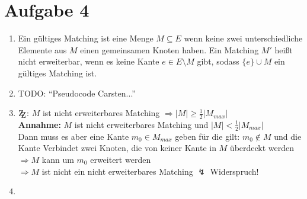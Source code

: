 \documentclass[10pt,a4paper]{article}
\newcommand{\zz}{\mathrm{Z\kern-.3em\raise-0.5ex\hbox{Z}}}
\begin{document}
\section*{Aufgabe 4}

    \begin{enumerate}[label={\alph*)}]
        \item Ein gültiges Matching ist eine Menge $M \subseteq E$ wenn keine
            zwei unterschiedliche Elemente aus $M$ einen gemeinsamen Knoten
            haben.
            Ein Matching $M'$ heißt nicht erweiterbar, wenn es keine Kante
            $ e \in E \setminus M$ gibt, sodass $\{e\} \cup M$ ein gültiges
            Matching ist.
        \item
            TODO: ``Pseudocode Carsten...''
        \item
            $\zz$: $M$ ist nicht erweiterbares Matching $\Rightarrow
            |M| \geq \frac{1}{2}|M_{max}|$
            \\
            \textbf{Annahme:} $M$ ist nicht erweiterbares Matching und 
            $|M| < \frac{1}{2}|M_{max}|$
            \\ 
            Dann muss es aber eine Kante $m_0 \in M_{max}$ geben für
            die gilt: $m_0 \notin M$ und die Kante Verbindet zwei Knoten,
            die von keiner Kante in $M$ überdeckt werden
            \\
            $\Rightarrow M$ kann um $m_0$ erweitert werden
            \\
            $\Rightarrow M$ ist nicht ein nicht erweiterbares Matching
            $\lightning$ Widerspruch!            
        \item
            
            
    \end{enumerate}

    
\end{document}
